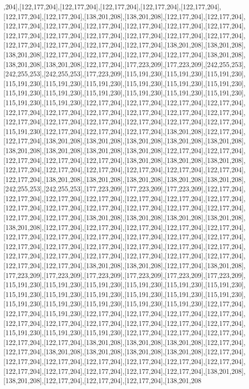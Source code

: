 ,204],[122,177,204],[122,177,204],[122,177,204],[122,177,204],[122,177,204],[122,177,204],[122,177,204],[138,201,208],[138,201,208],[122,177,204],[122,177,204],[122,177,204],[122,177,204],[122,177,204],[122,177,204],[122,177,204],[122,177,204],[122,177,204],[122,177,204],[122,177,204],[122,177,204],[122,177,204],[122,177,204],[122,177,204],[122,177,204],[122,177,204],[122,177,204],[138,201,208],[138,201,208],[138,201,208],[122,177,204],[122,177,204],[122,177,204],[122,177,204],[138,201,208],[138,201,208],[138,201,208],[122,177,204],[177,223,209],[177,223,209],[242,255,253],[242,255,253],[242,255,253],[177,223,209],[115,191,230],[115,191,230],[115,191,230],[115,191,230],[115,191,230],[115,191,230],[115,191,230],[115,191,230],[115,191,230],[115,191,230],[115,191,230],[115,191,230],[115,191,230],[115,191,230],[115,191,230],[115,191,230],[115,191,230],[122,177,204],[122,177,204],[122,177,204],[122,177,204],[122,177,204],[122,177,204],[122,177,204],[122,177,204],[122,177,204],[122,177,204],[122,177,204],[122,177,204],[122,177,204],[122,177,204],[122,177,204],[122,177,204],[115,191,230],[122,177,204],[122,177,204],[122,177,204],[138,201,208],[122,177,204],[122,177,204],[138,201,208],[138,201,208],[138,201,208],[138,201,208],[138,201,208],[138,201,208],[138,201,208],[138,201,208],[138,201,208],[122,177,204],[122,177,204],[122,177,204],[122,177,204],[122,177,204],[138,201,208],[138,201,208],[138,201,208],[122,177,204],[122,177,204],[122,177,204],[122,177,204],[122,177,204],[122,177,204],[122,177,204],[138,201,208],[138,201,208],[138,201,208],[138,201,208],[138,201,208],[242,255,253],[242,255,253],[177,223,209],[177,223,209],[177,223,209],[122,177,204],[122,177,204],[122,177,204],[122,177,204],[122,177,204],[122,177,204],[122,177,204],[122,177,204],[122,177,204],[122,177,204],[122,177,204],[122,177,204],[122,177,204],[122,177,204],[122,177,204],[138,201,208],[138,201,208],[138,201,208],[138,201,208],[138,201,208],[122,177,204],[122,177,204],[122,177,204],[122,177,204],[122,177,204],[122,177,204],[122,177,204],[122,177,204],[122,177,204],[122,177,204],[122,177,204],[122,177,204],[122,177,204],[122,177,204],[122,177,204],[122,177,204],[122,177,204],[122,177,204],[122,177,204],[122,177,204],[122,177,204],[122,177,204],[122,177,204],[122,177,204],[122,177,204],[138,201,208],[138,201,208],[122,177,204],[138,201,208],[177,223,209],[177,223,209],[177,223,209],[177,223,209],[177,223,209],[177,223,209],[115,191,230],[115,191,230],[115,191,230],[115,191,230],[115,191,230],[115,191,230],[115,191,230],[115,191,230],[115,191,230],[115,191,230],[115,191,230],[115,191,230],[115,191,230],[115,191,230],[115,191,230],[115,191,230],[115,191,230],[122,177,204],[122,177,204],[115,191,230],[122,177,204],[122,177,204],[122,177,204],[122,177,204],[122,177,204],[122,177,204],[122,177,204],[122,177,204],[122,177,204],[122,177,204],[115,191,230],[115,191,230],[115,191,230],[122,177,204],[122,177,204],[122,177,204],[122,177,204],[122,177,204],[138,201,208],[138,201,208],[138,201,208],[122,177,204],[122,177,204],[138,201,208],[138,201,208],[138,201,208],[138,201,208],[122,177,204],[122,177,204],[122,177,204],[122,177,204],[122,177,204],[122,177,204],[122,177,204],[122,177,204],[122,177,204],[122,177,204],[122,177,204],[122,177,204],[138,201,208],[138,201,208],[122,177,204],[122,177,204],[122,177,204],[138,201,208